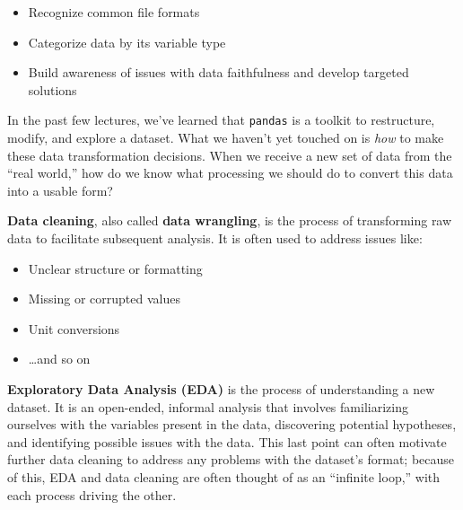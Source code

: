\documentclass[
  letterpaper,
  DIV=11,
  numbers=noendperiod]{scrreprt}
\providecommand{\tightlist}{%
  \setlength{\itemsep}{0pt}\setlength{\parskip}{0pt}}\usepackage{longtable,booktabs,array}
\begin{document}
\begin{tcolorbox}[enhanced jigsaw, arc=.35mm, left=2mm, toprule=.15mm, leftrule=.75mm, bottomrule=.15mm, colframe=quarto-callout-note-color-frame, rightrule=.15mm, colbacktitle=quarto-callout-note-color!10!white, opacitybacktitle=0.6, coltitle=black, bottomtitle=1mm, colback=white, toptitle=1mm, title=\textcolor{quarto-callout-note-color}{\faInfo}\hspace{0.5em}{Learning Outcomes}, breakable, opacityback=0, titlerule=0mm]

\begin{itemize}
\tightlist
\item
  Recognize common file formats
\item
  Categorize data by its variable type
\item
  Build awareness of issues with data faithfulness and develop targeted
  solutions
\end{itemize}

\end{tcolorbox}

In the past few lectures, we've learned that \texttt{pandas} is a
toolkit to restructure, modify, and explore a dataset. What we haven't
yet touched on is \emph{how} to make these data transformation
decisions. When we receive a new set of data from the ``real world,''
how do we know what processing we should do to convert this data into a
usable form?

\textbf{Data cleaning}, also called \textbf{data wrangling}, is the
process of transforming raw data to facilitate subsequent analysis. It
is often used to address issues like:

\begin{itemize}
\tightlist
\item
  Unclear structure or formatting
\item
  Missing or corrupted values
\item
  Unit conversions
\item
  \ldots and so on
\end{itemize}

\textbf{Exploratory Data Analysis (EDA)} is the process of understanding
a new dataset. It is an open-ended, informal analysis that involves
familiarizing ourselves with the variables present in the data,
discovering potential hypotheses, and identifying possible issues with
the data. This last point can often motivate further data cleaning to
address any problems with the dataset's format; because of this, EDA and
data cleaning are often thought of as an ``infinite loop,'' with each
process driving the other.
\end{document}
